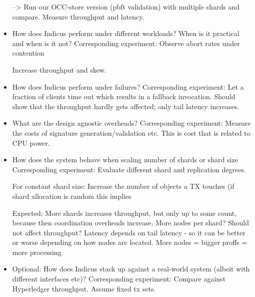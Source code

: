 \begin{itemize}
--> Run our OCC-store version (pbft validation) with multiple shards and compare. Measure throughput and latency.

\item How does Indicus perform under different workloads? When is it practical and when is it not?
Corresponding experiment: Observe abort rates under contention

Increase throughput and skew. 


\item How does Indicus perform under failures?
Corresponding experiment: Let a fraction of clients time out which results in a fallback invocation. Should show that the throughput hardly gets affected; only tail latency increases.

\item What are the design agnostic overheads?
Corresponding experiment: Measure the costs of signature generation/validation etc. This is cost that is related to CPU power.

\item How does the system behave when scaling number of shards or shard size
Corresponding experiment: Evaluate different shard and replication degrees.

For constant shard size: Increase the number of objects a TX touches (if shard allocation is random this implies 

Expected: More shards increases throughput, but only up to some count, because then coordination overheads increase. More nodes per shard? Should not affect throughput? Latency depends on tail latency - so it can be better or worse depending on how nodes are located. More nodes = bigger proffs = more processing
\item Optional: How does Indicus stack up against a real-world system (albeit with different interfaces etc)?
Corresponding experiment: Compare against Hyperledger throughput. Assume fixed tx sets.
\end{itemize}




